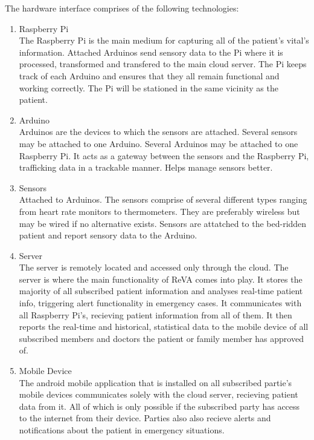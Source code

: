 The hardware interface comprises of the following technologies: 
\begin{enumerate}
\item{Raspberry Pi\\The Raspberry Pi is the main medium for capturing all of the patient's vital's information. Attached Arduinos send sensory data
to the Pi where it is processed, transformed and transfered to the main cloud server. The Pi keeps track of each Arduino and ensures that they all remain 
functional and working correctly. The Pi will be stationed in the same vicinity as the patient.}
\item{Arduino\\ Arduinos are the devices to which the sensors are attached. Several sensors may be attached to one Arduino. Several
Arduinos may be attached to one Raspberry Pi. It acts as a gateway between the sensors and the Raspberry Pi, trafficking data in a 
trackable manner. Helps manage sensors better.}
\item{Sensors\\ Attached to Arduinos. The sensors comprise of several different types ranging from heart rate monitors to thermometers. They are 
preferably wireless but may be wired if no alternative exists. Sensors are attatched to the bed-ridden patient and report sensory data to the Arduino.}
\item{Server\\ The server is remotely located and accessed only through the cloud. The server is where the main functionality of ReVA comes into play. 
It stores the majority of all subscribed patient information and analyses real-time patient info, triggering alert functionality in emergency cases. It 
communicates with all Raspberry Pi's, recieving patient information from all of them. It then reports the real-time and historical, statistical data to the mobile device of all 
subscribed members and doctors the patient or family member has approved of.} 
\item{Mobile Device\\ The android mobile application that is installed on all subscribed partie's mobile devices communicates solely with the cloud server,
recieving patient data from it. All of which is only possible if the subscribed party has access to the internet from their device. Parties also 
also recieve alerts and notifications about the patient in emergency situations.}
\end{enumerate}
